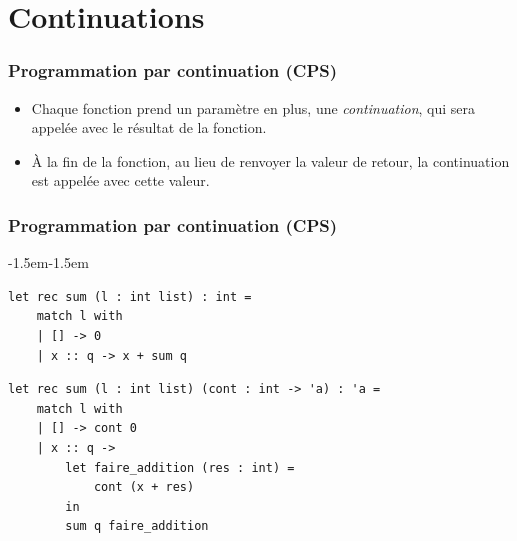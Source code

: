 \section{Continuations}

\begin{frame}[fragile,t]
    \frametitle{Programmation par continuation (CPS)}

    \begin{itemize}
        \item Chaque fonction prend un paramètre en plus, une \textit{continuation},
              qui sera appelée avec le résultat de la fonction.
        \item À la fin de la fonction, au lieu de renvoyer la valeur de retour,
              la continuation est appelée avec cette valeur.
    \end{itemize}
\end{frame}

\begin{frame}[fragile,t]
    \frametitle{Programmation par continuation (CPS)}

    \begin{adjustwidth}{-1.5em}{-1.5em}
        \begin{verbatim}
let rec sum (l : int list) : int =
    match l with
    | [] -> 0
    | x :: q -> x + sum q
        \end{verbatim}

        \vspace{0.5cm}

        \begin{verbatim}
let rec sum (l : int list) (cont : int -> 'a) : 'a =
    match l with
    | [] -> cont 0
    | x :: q ->
        let faire_addition (res : int) =
            cont (x + res)
        in
        sum q faire_addition
        \end{verbatim}
    \end{adjustwidth}
\end{frame}
